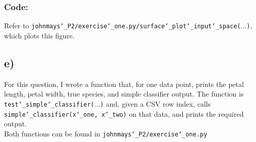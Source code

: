 \documentclass{article} %
\newcommand{\us}{\char`_}
\begin{document}
\subsubsection*{Code:}
Refer to \texttt{johnmays\us P2/exercise\us one.py/surface\char`_plot\char`_input\char`_space($\hdots$)}, which plots this figure.
\subsection*{e)}
For this question, I wrote a function that, for one data point, prints the petal length, petal width, true species, and simple classifier output.  The function is \texttt{test\char`_simple\char`_classifier($\hdots$)} and, given a CSV row index, calls \texttt{simple\char`_classifier(x\char`_one, x\char`_two)} on that data, and prints the required output.\\
Both functions can be found in \texttt{johnmays\us P2/exercise\us one.py}
\end{document}
